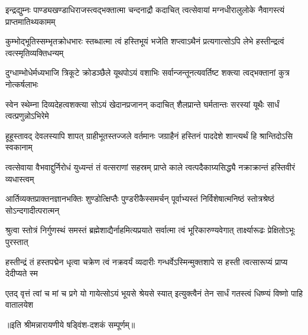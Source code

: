 \begin{center}

\twolineshloka
{इन्द्रद्युम्नः पाण्ड्यखण्डाधिराजस्त्वद्भक्तात्मा चन्दनाद्रौ कदाचित्}
{त्वत्सेवायां मग्नधीरालुलोके नैवागस्त्यं प्राप्तमातिथ्यकामम्}%

\twolineshloka
{कुम्भोद्भूतिस्सम्भृतक्रोधभारः स्तब्धात्मा त्वं हस्तिभूयं भजेति}
{शप्त्वाऽथैनं प्रत्यगात्सोऽपि लेभे हस्तीन्द्रत्वं त्वत्स्मृतिव्यक्तिधन्यम्}%

\twolineshloka
{दुग्धाम्भोधेर्मध्यभाजि त्रिकूटे क्रोडञ्छैले यूथपोऽयं वशाभिः}
{सर्वान्जन्तूनत्यवर्तिष्ट शक्त्या त्वद्भक्तानां कुत्र नोत्कर्षलाभः}%

\twolineshloka
{स्वेन स्थेम्ना दिव्यदेहत्वशक्त्या सोऽयं खेदानप्रजानन् कदाचित्}
{शैलप्रान्ते घर्मतान्तः सरस्यां यूथैः सार्धं त्वत्प्रणुन्नोऽभिरेमे}%

\twolineshloka
{हूहूस्तावद् देवलस्यापि शापत् ग्राहीभूतस्तज्जले वर्तमानः}
{जग्राहैनं हस्तिनं पाददेशे शान्त्यर्थं हि श्रान्तिदोऽसि स्वकानाम्}%

\twolineshloka
{त्वत्सेवाया वैभवाद्दुर्निरोधं युध्यन्तं तं वत्सराणां सहस्रम्}
{प्राप्ते काले त्वत्पदैकाग्र्यसिद्ध्यै नक्राक्रान्तं हस्तिवीरं व्यधास्त्वम्}%

\twolineshloka
{आर्तिव्यक्तप्राक्तनज्ञानभक्तिः शुण्डोत्क्षिप्तैः पुण्डरीकैस्समर्चन्}
{पूर्वाभ्यस्तं निर्विशेषात्मनिष्ठं स्तोत्रश्रेष्ठं सोऽन्दगादीत्परात्मन्}%

\twolineshloka
{श्रुत्वा स्तोत्रं निर्गुणस्थं समस्तं ब्रह्मेशाद्यैर्नाहमित्यप्रयाते}
{सर्वात्मा त्वं भूरिकारुण्यवेगात् तार्क्ष्यारूढः प्रेक्षितोऽभूः पुरस्तात्}%

\twolineshloka
{हस्तीन्द्रं तं हस्तपद्मेन धृत्वा चक्रेण त्वं नक्रवर्यं व्यदारीः}
{गन्धर्वेऽस्मिन्मुक्तशापे स हस्ती त्वत्सारूप्यं प्राप्य देदीप्यते स्म}%

\twolineshloka
{एतद् वृत्तं त्वां च मां च प्रगे यो गायेत्सोऽयं भूयसे श्रेयसे स्यात्}
{इत्युक्त्वैनं तेन सार्धं गतस्त्वं धिष्ण्यं विष्णो पाहि वातालयेश}%

॥इति श्रीमन्नारायणीये षड्विंश-दशकं सम्पूर्णम्॥

\closesection
\clearpage


\clearpage

\closesection
\clearpage
{}



\closesection
\clearpage


\end{center}
